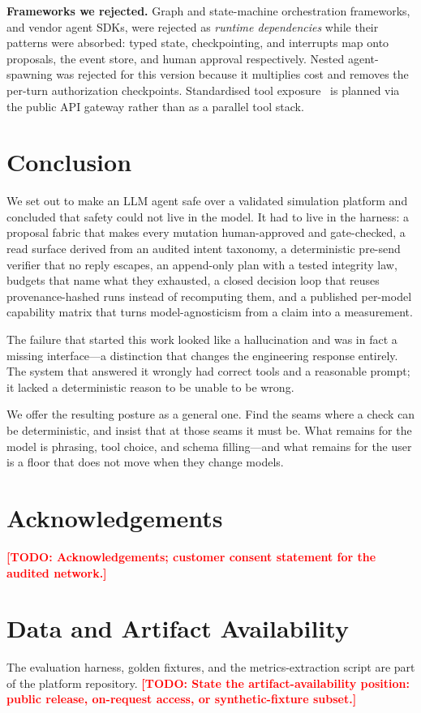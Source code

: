 \documentclass[conference]{IEEEtran}
\newcommand{\TODO}[1]{\textcolor{red}{\textbf{[TODO: #1]}}}
\begin{document}
\textbf{Frameworks we rejected.} Graph and state-machine orchestration
frameworks, and vendor agent SDKs, were rejected as \emph{runtime dependencies}
while their patterns were absorbed: typed state, checkpointing, and interrupts map
onto proposals, the event store, and human approval respectively. Nested
agent-spawning was rejected for this version because it multiplies cost and
removes the per-turn authorization checkpoints. Standardised tool
exposure~\cite{anthropic2024mcp} is planned via the public API gateway rather than
as a parallel tool stack.

\section{Conclusion}

We set out to make an LLM agent safe over a validated simulation platform and
concluded that safety could not live in the model. It had to live in the harness:
a proposal fabric that makes every mutation human-approved and gate-checked, a
read surface derived from an audited intent taxonomy, a deterministic pre-send
verifier that no reply escapes, an append-only plan with a tested integrity law,
budgets that name what they exhausted, a closed decision loop that reuses
provenance-hashed runs instead of recomputing them, and a published per-model
capability matrix that turns model-agnosticism from a claim into a measurement.

The failure that started this work looked like a hallucination and was in fact a
missing interface---a distinction that changes the engineering response entirely.
The system that answered it wrongly had correct tools and a reasonable prompt; it
lacked a deterministic reason to be unable to be wrong.

We offer the resulting posture as a general one. Find the seams where a check can
be deterministic, and insist that at those seams it must be. What remains for the
model is phrasing, tool choice, and schema filling---and what remains for the
user is a floor that does not move when they change models.

\section*{Acknowledgements}
\TODO{Acknowledgements; customer consent statement for the audited network.}

\section*{Data and Artifact Availability}
The evaluation harness, golden fixtures, and the metrics-extraction script are
part of the platform repository. \TODO{State the artifact-availability position:
public release, on-request access, or synthetic-fixture subset.}



\end{document}
